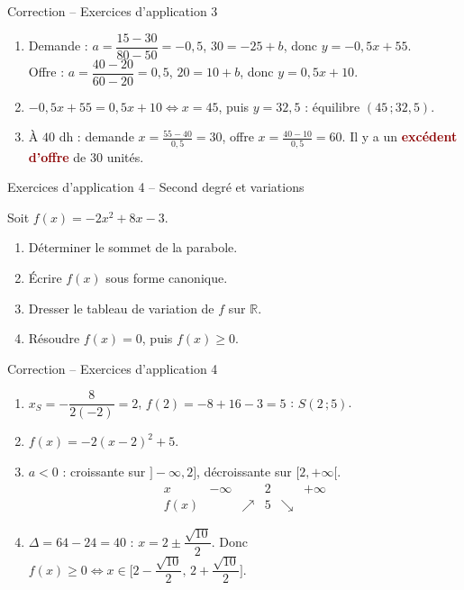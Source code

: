 \documentclass[aspectratio=169,11pt]{beamer}
\newcommand{\R}{\mathbb{R}}
\newcommand{\important}[1]{\textcolor{DarkRed}{\textbf{#1}}}
\begin{document}
\begin{frame}{Correction -- Exercices d'application 3}
	\small
	\begin{enumerate}
		\item Demande : $a=\dfrac{15-30}{80-50}=-0{,}5$, $30=-25+b$, donc $y=-0{,}5x+55$.\\
		Offre : $a=\dfrac{40-20}{60-20}=0{,}5$, $20=10+b$, donc $y=0{,}5x+10$.
		\item $-0{,}5x+55=0{,}5x+10\iff x=45$, puis $y=32{,}5$ : équilibre $(45\,;32{,}5)$.
		\item À $40$ dh : demande $x=\frac{55-40}{0{,}5}=30$, offre $x=\frac{40-10}{0{,}5}=60$. Il y a un \important{excédent d'offre} de $30$ unités.
	\end{enumerate}
\end{frame}

\begin{frame}{Exercices d'application 4 -- Second degré et variations}
	\begin{exercicebox}\small
		Soit $f(x)=-2x^2+8x-3$.
		\begin{enumerate}
			\item Déterminer le sommet de la parabole.
			\item Écrire $f(x)$ sous forme canonique.
			\item Dresser le tableau de variation de $f$ sur $\R$.
			\item Résoudre $f(x)=0$, puis $f(x)\ge0$.
		\end{enumerate}
	\end{exercicebox}
\end{frame}

\begin{frame}{Correction -- Exercices d'application 4}
	\small
	\begin{enumerate}
		\item $x_S=-\dfrac{8}{2(-2)}=2$, $f(2)=-8+16-3=5$ : $S(2\,;5)$.
		\item $f(x)=-2(x-2)^2+5$.
		\item $a<0$ : croissante sur $]-\infty,2]$, décroissante sur $[2,+\infty[$.
		\[
		\begin{array}{c|ccccc}
			x & -\infty & & 2 & & +\infty\\\hline
			f(x) & & \nearrow & 5 & \searrow &
		\end{array}
		\]
		\item $\Delta=64-24=40$ : $x=2\pm\dfrac{\sqrt{10}}{2}$. Donc $f(x)\ge0\iff x\in\Big[2-\dfrac{\sqrt{10}}2,\,2+\dfrac{\sqrt{10}}2\Big]$.
	\end{enumerate}
\end{frame}
\end{document}
